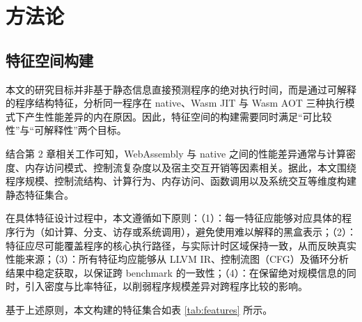 \chapter{方法论}


\label{cha:methodology}


\section{特征空间构建}

本文的研究目标并非基于静态信息直接预测程序的绝对执行时间，而是通过可解释的程序结构特征，分析同一程序在 native、Wasm JIT 与 Wasm AOT 三种执行模式下产生性能差异的内在原因。因此，特征空间的构建需要同时满足“可比较性”与“可解释性”两个目标。

结合第 2 章相关工作可知，WebAssembly 与 native 之间的性能差异通常与计算密度、内存访问模式、控制流复杂度以及宿主交互开销等因素相关\cite{jangda2021not,mao2024ewapa,jiang2023revealing}。据此，本文围绕程序规模、控制流结构、计算行为、内存访问、函数调用以及系统交互等维度构建静态特征集合。

在具体特征设计过程中，本文遵循如下原则：（1）：每一特征应能够对应具体的程序行为（如计算、分支、访存或系统调用），避免使用难以解释的黑盒表示；（2）：特征应尽可能覆盖程序的核心执行路径，与实际计时区域保持一致，从而反映真实性能来源；（3）：所有特征均应能够从 LLVM IR、控制流图（CFG）及循环分析结果中稳定获取，以保证跨 benchmark 的一致性；（4）：在保留绝对规模信息的同时，引入密度与比率特征，以削弱程序规模差异对跨程序比较的影响。

基于上述原则，本文构建的特征集合如表 \ref{tab:features} 所示。


